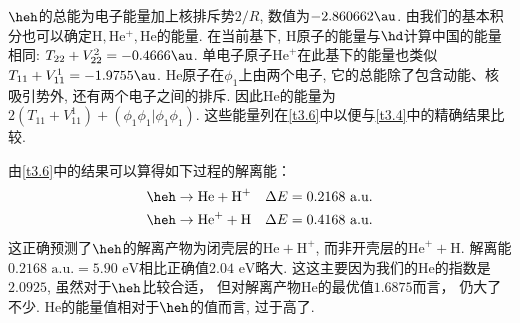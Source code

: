 $\heh$的总能为电子能量加上核排斥势$2/R$, 数值为$-2.860662\au$. 
由我们的基本积分也可以确定$\mathrm{H,He^+,He}$的能量. 
在当前基下, $\mathrm{H}$原子的能量与$\hd$计算中国的能量相同: $T_{22}+V_{22}^2=-0.4666\au$. 
单电子原子$\mathrm{He}^+$在此基下的能量也类似$T_{11}+V_{11}^1=-1.9755\au$. 
$\mathrm{He}$原子在$\phi_1$上由两个电子, 它的总能除了包含动能、核吸引势外, 还有两个电子之间的排斥. 
因此$\mathrm{He}$的能量为$2(T_{11}+V_{11}^1)+(\phi_1\phi_1|\phi_1\phi_1)$. 
这些能量列在\autoref{t3.6}中以便与\autoref{t3.4}中的精确结果比较.

由\autoref{t3.6}中的结果可以算得如下过程的解离能：
\begin{align}
	\heh & \to \text{He} + \text{H}^+ \quad \Delta E = 0.2168\,\, \text{a.u.}\\
	\heh & \to \text{He}^+ + \text{H} \quad \Delta E = 0.4168\,\, \text{a.u.}
\end{align}
这正确预测了$\heh$的解离产物为闭壳层的$\text{He}+\text{H}^+$, 
而非开壳层的$\text{He}^++\text{H}$. 
解离能$0.2168\,\,\text{a.u.}=5.90\,\,\text{eV}$相比正确值$2.04\,\,\text{eV}$略大.
这这主要因为我们的$\text{He}$的指数是$2.0925$, 
虽然对于$\heh$比较合适， 
但对解离产物$\text{He}$的最优值$1.6875$而言，
仍大了不少. 
$\text{He}$的能量值相对于$\heh$的值而言, 
过于高了.

